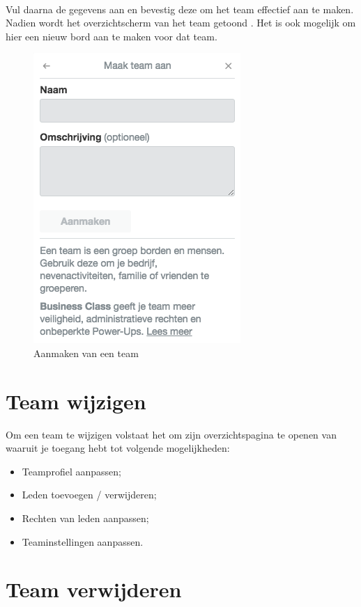 \noindent
\\Vul daarna de gegevens aan  en bevestig deze om het team effectief aan te maken. Nadien wordt het overzichtscherm van het team getoond . Het is ook mogelijk om hier een nieuw bord aan te maken voor dat team.

\begin{figure}[H]
	\centering
	\includegraphics[scale=0.6]{./afbeeldingen/aanmaken_team.png}
	\caption{Aanmaken van een team}
	\label{fig:aanmaken_team}	
\end{figure} 

\section{Team wijzigen}

Om een team te wijzigen volstaat het om zijn overzichtspagina te openen van waaruit je toegang hebt tot volgende mogelijkheden:
\begin{itemize}
	\item Teamprofiel aanpassen;
	\item Leden toevoegen / verwijderen;
	\item Rechten van leden aanpassen;
	\item Teaminstellingen aanpassen.
\end{itemize}

\section{Team verwijderen}

